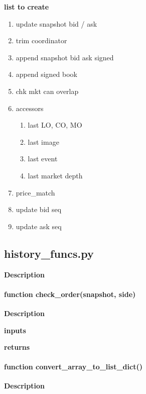 \documentclass[refman]{article}
\begin{document}



	












\textbf{list to create}
\begin{enumerate}
	\item update snapshot bid / ask
	\item trim coordinator
	\item append snapshot bid ask signed
	\item append signed book
	\item chk mkt can overlap
	\item accessors\begin{enumerate}
		\item last LO, CO, MO
		\item last image
		\item last event
		\item last market depth
	\end{enumerate}
	\item price\_match 
	\item update bid seq
	\item update ask seq
\end{enumerate}



\subsection{history\_funcs.py}\hfill \break
\noindent \textbf{Description}



\paragraph{\textbf{function} check\_order(snapshot, side)}\hfill\break
\noindent \textbf{Description}

\noindent \textbf{inputs}

\noindent \textbf{returns}

\paragraph{\textbf{function} convert\_array\_to\_list\_dict()}\hfill\break
\noindent \textbf{Description}
\end{document}
